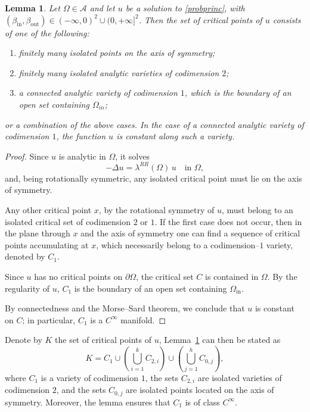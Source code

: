 \documentclass[oneside,a4paper,11pt,notitlepage]{article}
\newcommand{\Simm}{\mathcal A}
\newcommand{\betaposneg}{(-\infty,0)^2\cup(0, +\infty]^2}
\theoremstyle{plain}
\numberwithin{teor}{section}
\numberwithin{equation}{section}
\theoremstyle{definition}
\theoremstyle{plain}
\newtheorem{lemma}[lemma]{Lemma}
\theoremstyle{plain}
\theoremstyle{plain}
\theoremstyle{plain}
\theoremstyle{definition}
\theoremstyle{definition}
\theoremstyle{plain}
\begin{document}
\begin{lemma}
\label{codimentions}
Let $\Omega \in \Simm$ and let $u$ be a solution to \eqref{probprinc}, with $(\beta_{\mathrm{in}}, \beta_{\mathrm{out}}) \in \betaposneg$. Then the set of critical points of $u$ consists of one of the following:
\begin{enumerate}
    \item finitely many isolated points on the axis of symmetry;
    \item finitely many isolated analytic varieties of codimension $2$;
    \item a connected analytic variety of codimension $1$, which is the boundary of an open set containing $\Omega_{in}$;
\end{enumerate}
or a combination of the above cases.
In the case of a connected analytic variety of codimension $1$, the function $u$ is constant along such a variety.
\end{lemma}
\begin{proof}
Since $u$ is analytic in $\Omega$, it solves
\[
- \Delta u = \lambda^{RR}(\Omega)\, u \quad \text{in } \Omega,
\]
and, being rotationally symmetric, any isolated critical point must lie on the axis of symmetry.

Any other critical point $x$, by the rotational symmetry of $u$, must belong to an isolated critical set of codimension $2$ or $1$. If the first case does not occur, then in the plane through $x$ and the axis of symmetry one can find a sequence of critical points accumulating at $x$, which necessarily belong to a codimension--$1$ variety, denoted by $C_1$.

Since $u$ has no critical points on $\partial \Omega$, the critical set $C$ is contained in $\Omega$. By the regularity of $u$, $C_1$ is the boundary of an open set containing $\Omega_{\mathrm{in}}$.

By connectedness and the Morse--Sard theorem, we conclude that $u$ is constant on $C$; in particular, $C_1$ is a $C^\infty$ manifold.

\end{proof}

Denote by $K$ the set of critical points of $u$, Lemma~\ref{codimentions} can then be stated as
\[
K = C_1 \cup \left( \bigcup_{i=1}^k C_{2,i} \right) \cup \left( \bigcup_{j=1}^h C_{0,j} \right),
\]
where $C_1$ is a variety of codimension $1$, the sets $C_{2,i}$ are isolated varieties of codimension $2$, and the sets $C_{0,j}$ are isolated points located on the axis of symmetry.
Moreover, the lemma ensures that $C_1$ is of class $C^\infty$.
\end{document}
